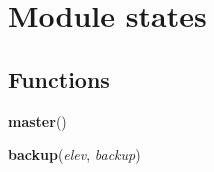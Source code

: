 %
%
%


\section{Module states}

    \label{states}


  \subsection{Functions}

    \label{states:master}

    \vspace{0.5ex}

\hspace{.8\funcindent}\begin{boxedminipage}{\funcwidth}

    \raggedright \textbf{master}()

\setlength{\parskip}{2ex}
\setlength{\parskip}{1ex}
    \end{boxedminipage}

    \label{states:backup}

    \vspace{0.5ex}

\hspace{.8\funcindent}\begin{boxedminipage}{\funcwidth}

    \raggedright \textbf{backup}(\textit{elev}, \textit{backup})

\setlength{\parskip}{2ex}
\setlength{\parskip}{1ex}
    \end{boxedminipage}

    \label{states:slave}

